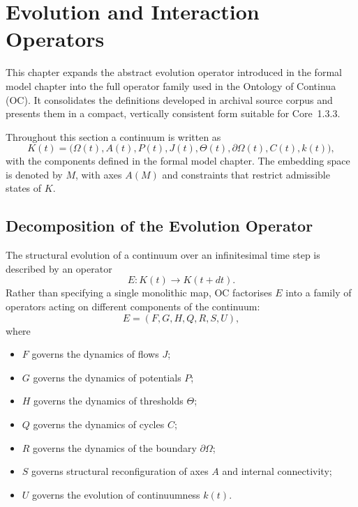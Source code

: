 
\section{Evolution and Interaction Operators}
\label{sec:operators-full}

This chapter expands the abstract evolution operator introduced in
the formal model chapter into the full operator family used in the Ontology of
Continua (OC). It consolidates the definitions developed in archival source corpus and
presents them in a compact, vertically consistent form suitable for Core~1.3.3.

Throughout this section a continuum is written as
\[
  K(t) =
  \big(
    \Omega(t), A(t), P(t), J(t),
    \Theta(t), \partial\Omega(t), C(t), k(t)
  \big),
\]
with the components defined in the formal model chapter. The embedding space is
denoted by \(M\), with axes \(A(M)\) and constraints that restrict admissible
states of \(K\).

\subsection{Decomposition of the Evolution Operator}

The structural evolution of a continuum over an infinitesimal time step is
described by an operator
\[
  E : K(t) \longrightarrow K(t+dt).
\]
Rather than specifying a single monolithic map, OC factorises \(E\) into a
family of operators acting on different components of the continuum:
\[
  E = (F, G, H, Q, R, S, U),
\]
where
\begin{itemize}
  \item \(F\) governs the dynamics of flows \(J\);
  \item \(G\) governs the dynamics of potentials \(P\);
  \item \(H\) governs the dynamics of thresholds \(\Theta\);
  \item \(Q\) governs the dynamics of cycles \(C\);
  \item \(R\) governs the dynamics of the boundary \(\partial\Omega\);
  \item \(S\) governs structural reconfiguration of axes \(A\) and internal
        connectivity;
  \item \(U\) governs the evolution of continuumness \(k(t)\).
\end{itemize}


